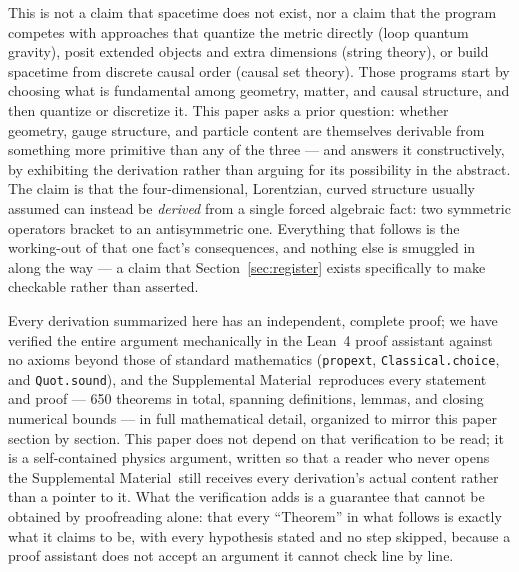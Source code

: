 \documentclass[aps,prd,twocolumn,superscriptaddress,nofootinbib]{revtex4-2}
\newcommand{\SM}{Supplemental Material}
\begin{document}
This is not a claim that spacetime does not exist, nor a claim that the
program competes with approaches that quantize the metric directly (loop
quantum gravity), posit extended objects and extra dimensions (string
theory), or build spacetime from discrete causal order (causal set
theory). Those programs start by choosing what is fundamental among
geometry, matter, and causal structure, and then quantize or discretize
it. This paper asks a prior question: whether geometry, gauge structure,
and particle content are themselves derivable from something more
primitive than any of the three — and answers it constructively, by
exhibiting the derivation rather than arguing for its possibility in the
abstract. The claim is that the four-dimensional, Lorentzian, curved
structure usually assumed can instead be \emph{derived} from a single
forced algebraic fact: two symmetric operators bracket to an
antisymmetric one. Everything that follows is the working-out of that
one fact's consequences, and nothing else is smuggled in along the way —
a claim that Section~\ref{sec:register} exists specifically to make
checkable rather than asserted.

Every derivation summarized here has an independent, complete proof; we
have verified the entire argument mechanically in the Lean~4 proof
assistant against no axioms beyond those of standard mathematics
(\texttt{propext}, \texttt{Classical.choice}, and \texttt{Quot.sound}),
and the \SM\ reproduces every statement and proof — 650 theorems in
total, spanning definitions, lemmas, and closing numerical bounds — in
full mathematical detail, organized to mirror this paper section by
section. This paper does not depend on that verification to be read; it
is a self-contained physics argument, written so that a reader who
never opens the \SM\ still receives every derivation's actual content
rather than a pointer to it. What the verification adds is a guarantee
that cannot be obtained by proofreading alone: that every ``Theorem'' in
what follows is exactly what it claims to be, with every hypothesis
stated and no step skipped, because a proof assistant does not accept an
argument it cannot check line by line.
\end{document}
